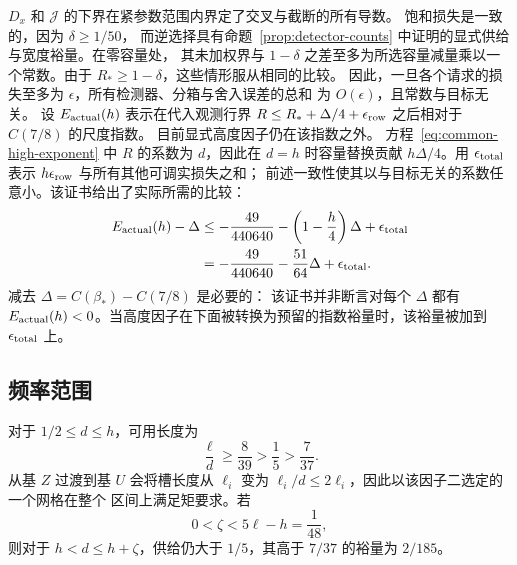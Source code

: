 \documentclass[11pt,a4paper]{article}
\numberwithin{equation}{section}
\numberwithin{figure}{section}
\theoremstyle{definition}
\theoremstyle{remark}
\begin{document}
\(D_x\) 和 \(\mathcal J\) 的下界在紧参数范围内界定了交叉与截断的所有导数。
饱和损失是一致的，因为 \(\delta\ge1/50\)，
而逆选择具有命题~\ref{prop:detector-counts} 中证明的显式供给与宽度裕量。在零容量处，
其未加权界与 \(1-\delta\) 之差至多为所选容量减量乘以一个常数。由于
\(R_*\ge1-\delta\)，这些情形服从相同的比较。
因此，一旦各个请求的损失至多为 \(\epsilon\)，所有检测器、分箱与舍入误差的总和
为 \(O(\epsilon)\)，且常数与目标无关。
设 \(E_{\rm actual}(h)\) 表示在代入观测行界
\(R\le R_*+\Delta/4+\epsilon_{\rm row}\) 之后相对于
\(C(7/8)\) 的尺度指数。
目前显式高度因子仍在该指数之外。
方程~\eqref{eq:common-high-exponent} 中 \(R\) 的系数为 \(d\)，因此在 \(d=h\) 时容量替换贡献
\(h\Delta/4\)。用 \(\epsilon_{\rm total}\) 表示
\(h\epsilon_{\rm row}\) 与所有其他可调实损失之和；
前述一致性使其以与目标无关的系数任意小。该证书给出了实际所需的比较：
\begin{equation}
 \begin{split}
 E_{\rm actual}(h)-\Delta
 &\le-\frac{49}{440640}-\left(1-\frac h4\right)\Delta
       +\epsilon_{\rm total}\\
 &=-\frac{49}{440640}-\frac{51}{64}\Delta
       +\epsilon_{\rm total}.
 \end{split}
 \label{eq:adaptive-endpoint}
\end{equation}
减去 \(\Delta=C(\beta_*)-C(7/8)\) 是必要的：
该证书并非断言对每个 \(\Delta\) 都有 \(E_{\rm actual}(h)<0\)。当高度因子在下面被转换为预留的指数裕量时，该裕量被加到
\(\epsilon_{\rm total}\) 上。

\subsection{频率范围}

对于 \(1/2\le d\le h\)，可用长度为
\[
 \frac{\ell}{d}\ge\frac8{39}>\frac15>\frac7{37}.
\]
从基 \(Z\) 过渡到基 \(U\) 会将槽长度从
\(\ell_i\) 变为 \(\ell_i/d\le2\ell_i\)，因此以该因子二选定的一个网格在整个
区间上满足矩要求。若
\[
 0<\zeta<5\ell-h=\frac1{48},
\]
则对于 \(h<d\le h+\zeta\)，供给仍大于
\(1/5\)，其高于 \(7/37\) 的裕量为 \(2/185\)。
\end{document}
